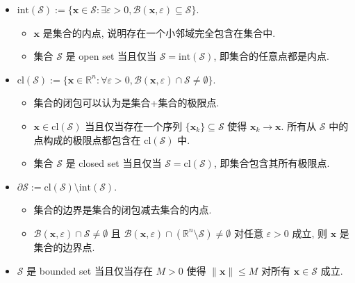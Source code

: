 \documentclass[11pt,UTF8,scheme=plain,fontset=fandol,linespread=1.3]{ctexart}
\numberwithin{figure}{section}
\begin{document}
\begin{itemize}
\item {}$\text{int}(\mathcal{S}) := \{\bm{x} \in \mathcal{S}: \exists \varepsilon > 0, \mathcal{B}(\bm{x}, \varepsilon) \subseteq \mathcal{S}\}$.

\begin{itemize}
\item {}$\bm{x}$ 是集合的内点, 说明存在一个小邻域完全包含在集合中.


\item {}集合 $\mathcal{S}$ 是 open set 当且仅当 $\mathcal{S} = \text{int}(\mathcal{S})$, 即集合的任意点都是内点.


\end{itemize}


\item {}$\text{cl}(\mathcal{S}) := \{\bm{x} \in \mathbb{R}^n: \forall \varepsilon > 0, \mathcal{B}(\bm{x}, \varepsilon) \cap \mathcal{S} \neq \emptyset\}$.

\begin{itemize}
\item {}集合的闭包可以认为是集合+集合的极限点.


\item {}$\bm{x} \in \text{cl}(\mathcal{S})$ 当且仅当存在一个序列 $\{\bm{x}_k\} \subseteq \mathcal{S}$ 使得 $\bm{x}_k \to \bm{x}$. 所有从 $\mathcal{S}$ 中的点构成的极限点都包含在 $\text{cl}(\mathcal{S})$ 中.


\item {}集合 $\mathcal{S}$ 是 closed set 当且仅当 $\mathcal{S} = \text{cl}(\mathcal{S})$, 即集合包含其所有极限点.


\end{itemize}


\item {}$\partial \mathcal{S} := \text{cl}(\mathcal{S}) \setminus \text{int}(\mathcal{S})$.

\begin{itemize}
\item {}集合的边界是集合的闭包减去集合的内点.


\item {}$\mathcal{B}(\bm{x}, \varepsilon) \cap \mathcal{S} \neq \emptyset$ 且 $\mathcal{B}(\bm{x}, \varepsilon) \cap (\mathbb{R}^n \setminus \mathcal{S}) \neq \emptyset$ 对任意 $\varepsilon > 0$ 成立, 则 $\bm{x}$ 是集合的边界点.


\end{itemize}


\item {}$\mathcal{S}$ 是 bounded set 当且仅当存在 $M > 0$ 使得 $\|\bm{x}\| \leq M$ 对所有 $\bm{x} \in \mathcal{S}$ 成立.



\end{itemize}
\end{document}
